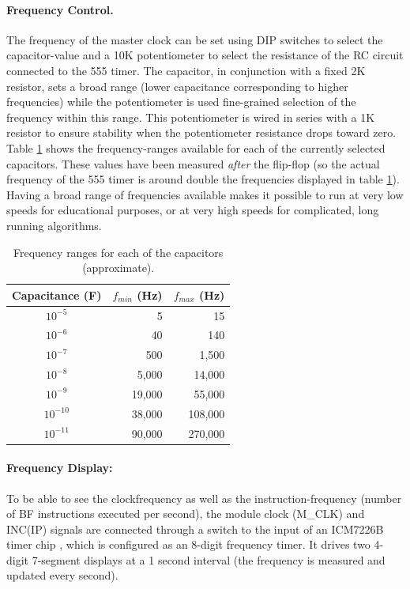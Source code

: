 \paragraph{Frequency Control.} The frequency of the master clock can be set using DIP switches to select the capacitor-value and a 10K potentiometer to select the resistance of the RC circuit connected to the 555 timer. The capacitor, in conjunction with a fixed 2K resistor, sets a broad range (lower capacitance corresponding to higher frequencies) while the potentiometer is used fine-grained selection of the frequency within this range. This potentiometer is wired in series with a 1K resistor to ensure stability when the potentiometer resistance drops toward zero. Table \ref{tab:frequencycontrol} shows the frequency-ranges available for each of the currently selected capacitors. These values have been measured \emph{after} the flip-flop (so the actual frequency of the 555 timer is around double the frequencies displayed in table \ref{tab:frequencycontrol}). Having a broad range of frequencies available makes it possible to run at very low speeds for educational purposes, or at very high speeds for complicated, long running algorithms.

\begin{table}
  \centering
  \begin{tabular}{c|r|r}
    Capacitance (F) & $f_{min}$ (Hz) & $f_{max}$ (Hz) \\ \hline
    $10^{-5}$  & 5 & 15 \\
    $10^{-6}$  & 40 & 140 \\
    $10^{-7}$  & 500 & 1,500 \\
    $10^{-8}$  & 5,000 & 14,000 \\
    $10^{-9}$  & 19,000 & 55,000 \\
    $10^{-10}$ & 38,000 & 108,000 \\
    $10^{-11}$ & 90,000 & 270,000 \\
  \end{tabular}
  \caption{Frequency ranges for each of the capacitors (approximate).}
  \label{tab:frequencycontrol}
\end{table}

\paragraph{Frequency Display:} To be able to see the clockfrequency as well as the instruction-frequency (number of BF instructions executed per second), the module clock (M\_CLK) and INC(IP) signals are connected through a switch to the input of an ICM7226B timer chip \cite{7226B}, which is configured as an 8-digit frequency timer. It drives two 4-digit 7-segment displays at a 1 second interval (the frequency is measured and updated every second). 

